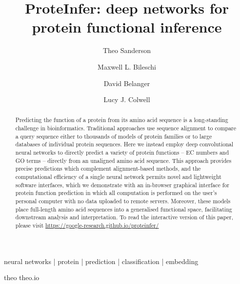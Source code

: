 \title{ProteInfer: deep networks for protein functional inference}
\author[*,1,\Letter]{Theo Sanderson}
\author[*,2]{Maxwell L. Bileschi}
\author[2]{David Belanger}
\author[2]{Lucy J. Colwell}




\maketitle



\begin{abstract}
  Predicting the function of a protein from its amino acid sequence is a long-standing challenge in bioinformatics. Traditional approaches use sequence alignment to compare a query sequence either to thousands of models of protein families or to large databases of individual protein sequences. Here we instead employ deep convolutional neural networks to directly predict a variety of protein functions -- EC numbers and GO terms -- directly from an unaligned amino acid sequence. This approach provides precise predictions which complement alignment-based methods, and the computational efficiency of a single neural network permits novel and lightweight software interfaces, which we demonstrate with an in-browser graphical interface for protein function prediction in which all computation is performed on the user's personal computer with no data uploaded to remote servers. Moreover, these models place full-length amino acid sequences into a generalised functional space, facilitating downstream analysis and interpretation. To read the interactive version of this paper, please visit \url{https://google-research.github.io/proteinfer/}
\end {abstract}

\begin{keywords}
neural networks | protein | prediction | classification | embedding
\end{keywords}


\begin{corrauthor}
theo \at \;theo.io
\end{corrauthor}

